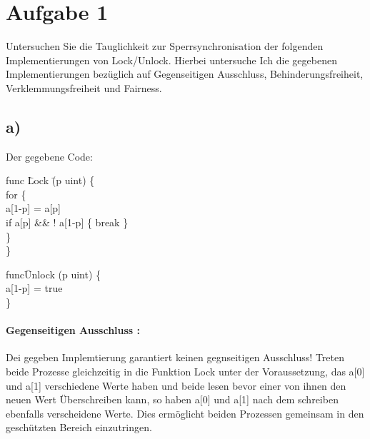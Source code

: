 \section*{Aufgabe 1}

Untersuchen Sie die Tauglichkeit zur Sperrsynchronisation der folgenden Implementierungen von Lock/Unlock. Hierbei untersuche Ich die gegebenen Implementierungen bezüglich auf Gegenseitigen Ausschluss, Behinderungsfreiheit, Verklemmungsfreiheit und Fairness.


\subsection*{ a) }

Der gegebene Code:

\begin{mylisting}



\begin{tabbing}
func \= Lock \= (p uint)  \{  \\
\>	for \{ \> \\
\>	\>	a[1-p] = \! a[p] \\
\>	\>	if a[p] \&\& ! a[1-p] \{ break \} \\
\>	\}  \>\\
\}\> \> \\
\end{tabbing} 



\begin{tabbing}
func\= Unlock (p uint) \{\\
\>	a[1-p] = true\\
\}\\
\end{tabbing} 



\end{mylisting}

\paragraph{ Gegenseitigen Ausschluss : }

Dei gegeben Implemtierung garantiert keinen gegnseitigen Ausschluss! Treten beide Prozesse gleichzeitig in die Funktion Lock unter der Voraussetzung, das a[0] und a[1] verschiedene Werte haben und beide lesen bevor einer von ihnen den neuen Wert Überschreiben kann, so haben a[0] und a[1] nach dem schreiben ebenfalls verscheidene Werte. Dies ermöglicht beiden Prozessen gemeinsam in den geschützten Bereich einzutringen.

